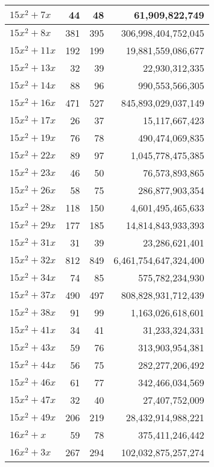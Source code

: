 \documentclass[a4paper]{amsproc}
\theoremstyle{plain}
\theoremstyle{named}
\begin{document}
\begin{longtable}{ | l | r | r | r | }
$15x^2 + 7x$ & 44 & 48 & 61{,}909{,}822{,}749 \\ \hline
$15x^2 + 8x$ & 381 & 395 & 306{,}998{,}404{,}752{,}045 \\ \hline
$15x^2 + 11x$ & 192 & 199 & 19{,}881{,}559{,}086{,}677 \\ \hline
$15x^2 + 13x$ & 32 & 39 & 22{,}930{,}312{,}335 \\ \hline
$15x^2 + 14x$ & 88 & 96 & 990{,}553{,}566{,}305 \\ \hline
$15x^2 + 16x$ & 471 & 527 & 845{,}893{,}029{,}037{,}149 \\ \hline
$15x^2 + 17x$ & 26 & 37 & 15{,}117{,}667{,}423 \\ \hline
$15x^2 + 19x$ & 76 & 78 & 490{,}474{,}069{,}835 \\ \hline
$15x^2 + 22x$ & 89 & 97 & 1{,}045{,}778{,}475{,}385 \\ \hline
$15x^2 + 23x$ & 46 & 50 & 76{,}573{,}893{,}865 \\ \hline
$15x^2 + 26x$ & 58 & 75 & 286{,}877{,}903{,}354 \\ \hline
$15x^2 + 28x$ & 118 & 150 & 4{,}601{,}495{,}465{,}633 \\ \hline
$15x^2 + 29x$ & 177 & 185 & 14{,}814{,}843{,}933{,}393 \\ \hline
$15x^2 + 31x$ & 31 & 39 & 23{,}286{,}621{,}401 \\ \hline
$15x^2 + 32x$ & 812 & 849 & 6{,}461{,}754{,}647{,}324{,}400 \\ \hline
$15x^2 + 34x$ & 74 & 85 & 575{,}782{,}234{,}930 \\ \hline
$15x^2 + 37x$ & 490 & 497 & 808{,}828{,}931{,}712{,}439 \\ \hline
$15x^2 + 38x$ & 91 & 99 & 1{,}163{,}026{,}618{,}601 \\ \hline
$15x^2 + 41x$ & 34 & 41 & 31{,}233{,}324{,}331 \\ \hline
$15x^2 + 43x$ & 59 & 76 & 313{,}903{,}954{,}381 \\ \hline
$15x^2 + 44x$ & 56 & 75 & 282{,}277{,}206{,}492 \\ \hline
$15x^2 + 46x$ & 61 & 77 & 342{,}466{,}034{,}569 \\ \hline
$15x^2 + 47x$ & 32 & 40 & 27{,}407{,}752{,}009 \\ \hline
$15x^2 + 49x$ & 206 & 219 & 28{,}432{,}914{,}988{,}221 \\ \hline
$16x^2 + x$ & 59 & 78 & 375{,}411{,}246{,}442 \\ \hline
$16x^2 + 3x$ & 267 & 294 & 102{,}032{,}875{,}257{,}274 \\ \hline

\end{longtable}
\end{document}
